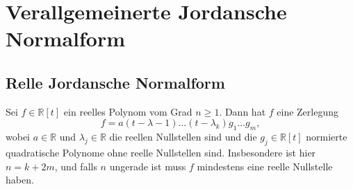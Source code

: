 \documentclass[11pt, a4paper]{article}
\begin{document}

\section{Verallgemeinerte Jordansche Normalform}
\subsection{Relle Jordansche Normalform}
\begin{theorem}
Sei $f \in \mathbb{R}[t]$ ein reelles Polynom vom Grad $n \geq 1$. Dann hat $f$ eine Zerlegung
$$
f = a(t - \lambda-1)...(t- \lambda_k)g_1...g_m,
$$
wobei $a \in \mathbb{R}$ und $\lambda_j \in \mathbb{R}$ die reellen Nullstellen sind und die $g_j \in \mathbb{R}[t]$ normierte quadratische Polynome ohne reelle Nullstellen sind. Insbesondere ist hier $n = k + 2m$, und falls $n$ ungerade ist muss $f$ mindestens eine reelle Nullstelle haben.
\end{theorem}

\end{document}
